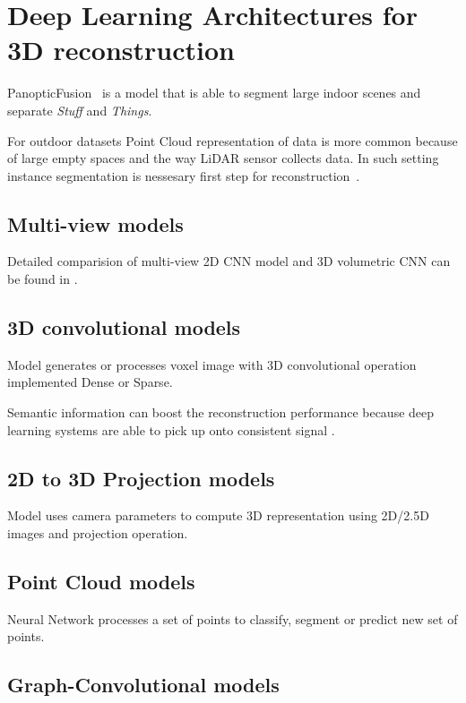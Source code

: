 \section{Deep Learning Architectures for 3D reconstruction}

PanopticFusion~\cite{narita2019panopticfusion} is a model that is able to segment large indoor scenes and separate \textit{Stuff} and \textit{Things}.


For outdoor datasets Point Cloud representation of data is more common because of large empty spaces and the way LiDAR sensor collects data. In such setting instance segmentation is nessesary first step for reconstruction~\cite{zhang2020instance}.

\subsection{Multi-view models}

Detailed comparision of multi-view 2D CNN model and 3D volumetric CNN can be found in \cite{qi2016volumetric}.
\subsection{3D convolutional models}

Model generates or processes voxel image with 3D convolutional operation implemented Dense or Sparse.

Semantic information can boost the reconstruction performance because deep learning systems are able to pick up onto consistent signal \cite{jiao2018look,tatarchenko2019single,kendall2018multi}.

\subsection{2D to 3D Projection models}

Model uses camera parameters to compute 3D representation using 2D/2.5D images and projection operation.

\subsection{Point Cloud models}

Neural Network processes a set of points to classify, segment or predict new set of points.

\subsection{Graph-Convolutional models}

